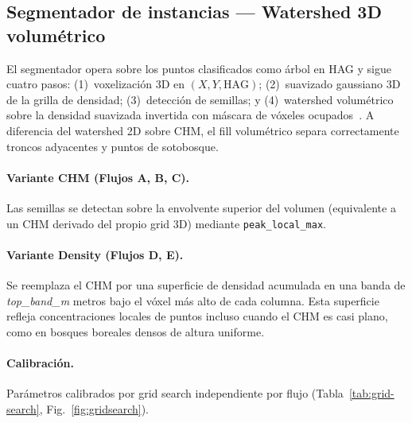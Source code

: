 \documentclass[runningheads]{llncs}
\begin{document}
\subsection{Segmentador de instancias --- Watershed 3D volum\'etrico}\label{sec:watershed}

El segmentador opera sobre los puntos clasificados como \'arbol en HAG y sigue cuatro pasos: (1)~voxelizaci\'on 3D en $(X, Y, \text{HAG})$; (2)~suavizado gaussiano 3D de la grilla de densidad; (3)~detecci\'on de semillas; y (4)~watershed volum\'etrico sobre la densidad suavizada invertida con m\'ascara de v\'oxeles ocupados~\cite{dalponte2016}. A diferencia del watershed 2D sobre CHM, el fill volum\'etrico separa correctamente troncos adyacentes y puntos de sotobosque.

\paragraph{Variante CHM (Flujos A, B, C).} Las semillas se detectan sobre la envolvente superior del volumen (equivalente a un CHM derivado del propio grid 3D) mediante \texttt{peak\_local\_max}.

\paragraph{Variante Density (Flujos D, E).} Se reemplaza el CHM por una superficie de densidad acumulada en una banda de \emph{top\_band\_m} metros bajo el v\'oxel m\'as alto de cada columna. Esta superficie refleja concentraciones locales de puntos incluso cuando el CHM es casi plano, como en bosques boreales densos de altura uniforme.

\paragraph{Calibraci\'on.}
Par\'ametros calibrados por grid search independiente por flujo (Tabla~\ref{tab:grid-search}, Fig.~\ref{fig:gridsearch}).

\begin{table}[H]
\centering
\caption{Par\'ametros \'optimos del Watershed~3D por flujo (grid search sobre val, F1 inst.\ IoU~3D~$\geq 0.5$).}\label{tab:grid-search}
\end{table}
\end{document}
